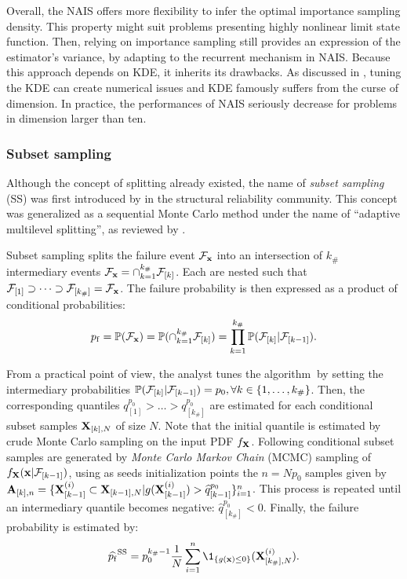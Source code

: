 Overall, the NAIS offers more flexibility to infer the optimal importance sampling density. 
This property might suit problems presenting highly nonlinear limit state function. 
Then, relying on importance sampling still provides an expression of the estimator's variance, by adapting  to the recurrent mechanism in NAIS. 
Because this approach depends on KDE, it inherits its drawbacks. 
As discussed in \citet{Morio_RESS_2011}, tuning the KDE can create numerical issues and KDE famously suffers from the curse of dimension. 
In practice, the performances of NAIS seriously decrease for problems in dimension larger than ten. 



\subsubsection{Subset sampling}
Although the concept of splitting already existed, the name of \textit{subset sampling} (SS) was first introduced by \citet{AuBeck2001} in the structural reliability community. 
This concept was generalized as a sequential Monte Carlo method under the name of ``adaptive multilevel splitting'', as reviewed by \citet{cerou_2019_sequentialMC}. 

Subset sampling splits the failure event $\mathcal{F}_{{\bf x}}$ into an intersection of $k_\#$ intermediary events $\mathcal{F}_{{\bf x}} = \cap_{k=1}^{k_\#} \mathcal{F}_{[k]}$.
Each are nested such that $\mathcal{F}_{[1]} \supset \dots \supset \mathcal{F}_{[k_\#]} = \mathcal{F}_{{\bf x}}$.
The failure probability is then expressed as a product of conditional probabilities:
\begin{equation}
    p_\mathrm{f} = \mathbb{P}(\mathcal{F}_{{\bf x}}) = \mathbb{P}(\cap_{k=1}^{k_\#} \mathcal{F}_{[k]}) = \prod_{k=1}^{k_\#} \mathbb{P}(\mathcal{F}_{[k]} | \mathcal{F}_{[k-1]}).
\end{equation}

From a practical point of view, the analyst tunes the algorithm\footnotemark$~$ by setting the intermediary probabilities $\mathbb{P}(\mathcal{F}_{[k]} | \mathcal{F}_{[k-1]}) = p_0, \forall k \in \{1, \dots, k_\# \}$. 
Then, the corresponding quantiles $q_{[1]}^{p_0} > \dots > q_{[k_\#]}^{p_0}$ are estimated for each conditional subset samples ${\bf X}_{[k], N}$ of size $N$. 
Note that the initial quantile is estimated by crude Monte Carlo sampling on the input PDF $f_{{\bf X}}$. 
Following conditional subset samples are generated by \textit{Monte Carlo Markov Chain} (MCMC) sampling of 
$f_{{\bf X}}({\bf x} |\mathcal{F}_{[k-1]})$, using as seeds initialization points the $n= N p_0$ samples given by $\mathbf{A}_{[k], n}=\{{\bf X}_{[k-1]}^{(i)} \subset {\bf X}_{[k-1], N}| g({\bf X}_{[k-1]}^{(i)}) > \widehat{q}_{[k-1]}^{p_0} \}_{i=1}^n$. 
This process is repeated until an intermediary quantile becomes negative: $\widehat{q}_{[k_\#]}^{p_0} < 0$. 
Finally, the failure probability is estimated by:
\begin{equation}
    \widehat{\pf}^{\mathrm{SS}} = p_0^{k_\# -1} \frac1N \sum_{i=1}^n \1_{\{g(\bx) \leq 0\}} (\bX_{[k_\#],N}^{(i)}).
    \label{eq:pf_SS}
\end{equation}

